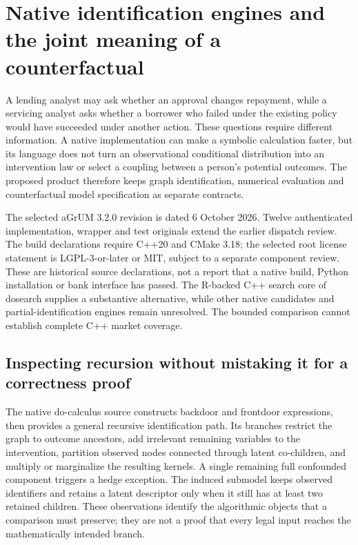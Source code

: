 \section{Native identification engines and the joint meaning of a counterfactual}
\label{exec19:cxxid-scope}
A lending analyst may ask whether an approval changes repayment, while a
servicing analyst asks whether a borrower who failed under the existing policy
would have succeeded under another action. These questions require different
information. A native implementation can make a symbolic calculation faster,
but its language does not turn an observational conditional distribution into
an intervention law or select a coupling between a person's potential outcomes.
The proposed product therefore keeps graph identification, numerical evaluation
and counterfactual model specification as separate contracts.

The selected aGrUM 3.2.0 revision is dated 6 October 2026. Twelve authenticated
implementation, wrapper and test originals extend the earlier dispatch review.
The build declarations require C++20 and CMake 3.18; the selected root license
statement is LGPL-3-or-later or MIT, subject to a separate component review.
These are historical source declarations, not a report that a native build,
Python installation or bank interface has passed. The R-backed C++ search core
of dosearch supplies a substantive alternative, while other native candidates
and partial-identification engines remain unresolved. The bounded comparison
cannot establish complete C++ market coverage.
\citep{exec19_cxx_identification_source,exec18_rid_dosearch}

\subsection{Inspecting recursion without mistaking it for a correctness proof}
\label{exec19:cxxid-recursion}
The native do-calculus source constructs backdoor and frontdoor expressions,
then provides a general recursive identification path. Its branches restrict
the graph to outcome ancestors, add irrelevant remaining variables to the
intervention, partition observed nodes connected through latent co-children,
and multiply or marginalize the resulting kernels. A single remaining full
confounded component triggers a hedge exception. The induced submodel keeps
observed identifiers and retains a latent descriptor only when it still has at
least two retained children. These observations identify the algorithmic
objects that a comparison must preserve; they are not a proof that every legal
input reaches the mathematically intended branch.
\citep{exec19_cxx_identification_source}

